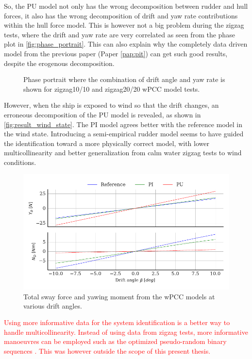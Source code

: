 So, the PU model not only has the wrong decomposition between rudder and hull forces, it also has the wrong decomposition of drift and yaw rate contributions within the hull force model. This is however not a big problem during the zigzag tests, where the drift and yaw rate are very correlated as seen from the phase plot in \autoref{fig:phase_portrait}. This can also explain why the completely data driven model from the previous paper (Paper \ref{pap:pit}) can get such good results, despite the erogenous decomposition.
\begin{figure}[h]
  \centering
  
  \caption{Phase portrait where the combination of drift angle and yaw rate is shown for zigzag10/10 and zigzag20/20 wPCC model tests.}
  \label{fig:phase_portrait}
\end{figure}
However, when the ship is exposed to wind so that the drift changes, an erroneous decomposition of the PU model is revealed, as shown in \autoref{fig:result_wind_state}. The PI model agrees better with the reference model in the wind state. Introducing a semi-empirical rudder model seems to have guided the identification toward a more physically correct model, with lower multicollinearity and better generalization from calm water zigzag tests to wind conditions.
\begin{figure}[h!]
    \includegraphics{kappa/images/result_wind_state.forces.pdf}
    \caption{Total sway force and yawing moment from the wPCC models at various drift angles.}
    \label{fig:result_wind_state}
\end{figure}

\textcolor{red}{
Using more informative data for the system identification is a better way to handle multicollinearity. Instead of using data from zigzag tests, more informative manoeuvres can be employed such as the optimized pseudo-random binary sequences \cite{yoon_identification_2003,wang_optimal_2020}. This was however outside the scope of this present thesis.
}

\FloatBarrier
\clearpage
